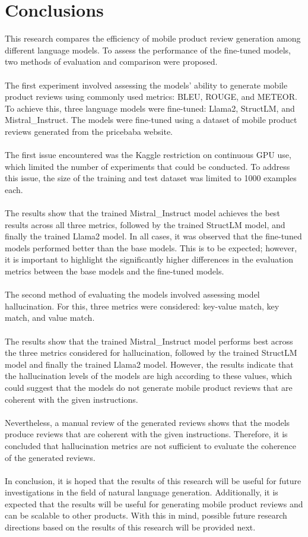 \section{Conclusions}
This research compares the efficiency of mobile product review generation among different language models. To assess the performance of the fine-tuned models, two methods of evaluation and comparison were proposed.
\\\\
The first experiment involved assessing the models' ability to generate mobile product reviews using commonly used metrics: BLEU, ROUGE, and METEOR. To achieve this, three language models were fine-tuned: Llama2, StructLM, and Mistral\_Instruct. The models were fine-tuned using a dataset of mobile product reviews generated from the pricebaba website.
\\\\
The first issue encountered was the Kaggle restriction on continuous GPU use, which limited the number of experiments that could be conducted. To address this issue, the size of the training and test dataset was limited to 1000 examples each.
\\\\
The results show that the trained Mistral\_Instruct model achieves the best results across all three metrics, followed by the trained StructLM model, and finally the trained Llama2 model. In all cases, it was observed that the fine-tuned models performed better than the base models. This is to be expected; however, it is important to highlight the significantly higher differences in the evaluation metrics between the base models and the fine-tuned models.
\\\\
The second method of evaluating the models involved assessing model hallucination. For this, three metrics were considered: key-value match, key match, and value match.
\\\\
The results show that the trained Mistral\_Instruct model performs best across the three metrics considered for hallucination, followed by the trained StructLM model and finally the trained Llama2 model. However, the results indicate that the hallucination levels of the models are high according to these values, which could suggest that the models do not generate mobile product reviews that are coherent with the given instructions.
\\\\
Nevertheless, a manual review of the generated reviews shows that the models produce reviews that are coherent with the given instructions. Therefore, it is concluded that hallucination metrics are not sufficient to evaluate the coherence of the generated reviews.
\\\\
In conclusion, it is hoped that the results of this research will be useful for future investigations in the field of natural language generation. Additionally, it is expected that the results will be useful for generating mobile product reviews and can be scalable to other products. With this in mind, possible future research directions based on the results of this research will be provided next.

